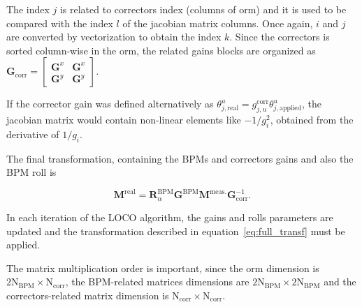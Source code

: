 The index $j$ is related to correctors index (columns of \gls{orm}) and it is used to be compared with the index $l$ of the jacobian matrix columns. Once again, $i$ and $j$ are converted by vectorization to obtain the index $k$. Since the correctors is sorted column-wise in the \gls{orm}, the related gains blocks are organized as $\mathbf{G}_{\mathrm{corr}} =
    \begin{bmatrix}
    \mathbf{G}^x & \mathbf{G}^x \\
    \mathbf{G}^y & \mathbf{G}^y
    \end{bmatrix}$.

If the corrector gain was defined alternatively as $\theta_{j, \mathrm{real}}^u = g_{j, u}^{\mathrm{corr}}\theta_{j, \mathrm{applied}}^u$, the jacobian matrix would contain non-linear elements like $-1/g_{i}^2$, obtained from the derivative of $1/g_{i}$.

The final transformation, containing the BPMs and correctors gains and also the BPM roll is

\begin{equation}
    \mathbf{M}^{\mathrm{real}} = \mathbf{R}^\mathrm{BPM}_\alpha\mathbf{G}^{\mathrm{BPM}} \mathbf{M}^{\mathrm{meas.}}\mathbf{G}^{-1}_{\mathrm{corr}}.
    \label{eq:full_transf}
\end{equation}

In each iteration of the LOCO algorithm, the gains and rolls parameters are updated and the transformation described in equation~\eqref{eq:full_transf} must be applied.

The matrix multiplication order is important, since the \gls{orm} dimension is $2\mathrm{N}_{\mathrm{BPM}} \times \mathrm{N}_{\mathrm{corr}}$, the BPM-related matrices dimensions are $2\mathrm{N}_{\mathrm{BPM}} \times 2\mathrm{N}_{\mathrm{BPM}}$ and the correctors-related matrix dimension is $\mathrm{N}_{\mathrm{corr}} \times \mathrm{N}_{\mathrm{corr}}$. 




